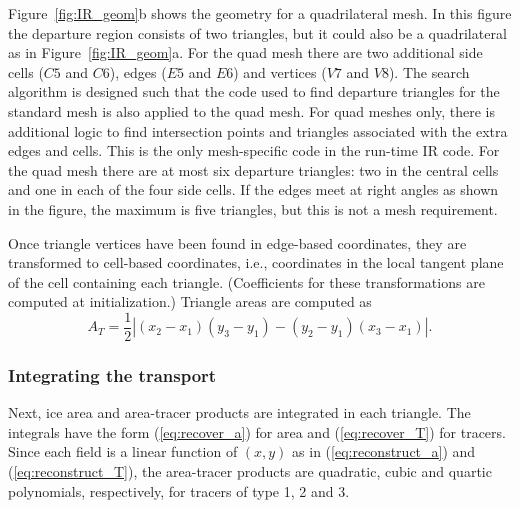Figure~\ref{fig:IR_geom}b shows the geometry for a quadrilateral mesh. In this figure the departure region consists of two triangles, but it could also be a quadrilateral as in Figure~\ref{fig:IR_geom}a. For the quad mesh there are two additional side cells ($C5$ and $C6$), edges ($E5$ and $E6$) and vertices ($V7$ and $V8$). The search algorithm is designed such that the code used to find departure triangles for the standard mesh is also  applied to the quad mesh. For quad meshes only, there is additional logic to find intersection points and triangles associated with the extra edges and cells. This is the only mesh-specific code in the run-time IR code. For the quad mesh there are at most six departure triangles: two in the central cells and one in each of the four side cells. If the edges meet at right angles as shown in the figure, the maximum is five triangles, but this is not a mesh requirement.

Once triangle vertices have been found in edge-based coordinates, they are transformed to cell-based coordinates, i.e., coordinates in the local tangent plane of the cell containing each triangle. (Coefficients for these transformations are computed at initialization.) Triangle areas are computed as 
\begin{equation}
\label{eq:triangle_area}
{{A}_{T}}=\frac{1}{2}\left| ({{x}_{2}}-{{x}_{1}})({{y}_{3}}-{{y}_{1}})-({{y}_{2}}-{{y}_{1}})({{x}_{3}}-{{x}_{1}}) \right|.
\end{equation}

\subsubsection{Integrating the transport}
\label{IR_integrate}

Next, ice area and area-tracer products are integrated in each triangle. The integrals have the form (\ref{eq:recover_a}) for area and (\ref{eq:recover_T}) for tracers. Since each field is a linear function of $(x,y)$ as in (\ref{eq:reconstruct_a}) and (\ref{eq:reconstruct_T}), the area-tracer products are quadratic, cubic and quartic polynomials, respectively, for tracers of type 1, 2 and 3.

